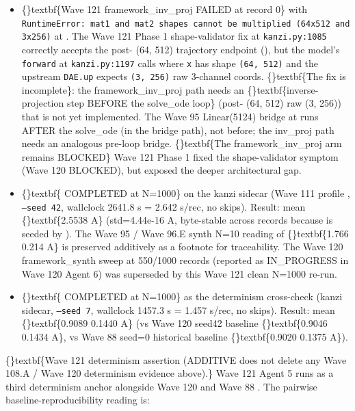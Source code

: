 \documentclass{article}
\begin{document}
\begin{itemize}
\item \{\}textbf\{Wave 121 framework\_inv\_proj FAILED at record 0\} with \texttt{RuntimeError: mat1 and mat2 shapes cannot be multiplied (64x512 and 3x256)} at . The Wave 121 Phase 1 shape-validator fix at \texttt{kanzi.py:1085} correctly accepts the post- (64, 512) trajectory endpoint (), but the model's \texttt{forward} at \texttt{kanzi.py:1197} calls  where \texttt{x} has shape \texttt{(64, 512)} and the upstream \texttt{DAE.up} expects \texttt{(3, 256)} raw 3-channel coords. \{\}textbf\{The fix is incomplete\}: the framework\_inv\_proj path needs an \{\}textbf\{inverse-projection step BEFORE the solve\_ode loop\} (post- (64, 512)  raw (3, 256)) that is not yet implemented. The Wave 95 Linear(5124) bridge at  runs AFTER the solve\_ode (in the bridge path), not before; the inv\_proj path needs an analogous pre-loop bridge. \{\}textbf\{The framework\_inv\_proj arm remains BLOCKED\}  Wave 121 Phase 1 fixed the shape-validator symptom (Wave 120 BLOCKED), but exposed the deeper architectural gap.
\end{itemize}
\begin{itemize}
\item \{\}textbf\{ COMPLETED at N=1000\} on the kanzi sidecar (Wave 111 profile , \texttt{--seed 42}, wallclock 2641.8 s = 2.642 s/rec, no skips). Result:  mean \{\}textbf\{2.5538 A\} (std=4.44e-16 A, byte-stable across records because  is seeded by ). The Wave 95 / Wave 96.E synth N=10 reading of \{\}textbf\{1.766  0.214 A\} is preserved additively as a footnote for traceability. The Wave 120 framework\_synth sweep at 550/1000 records (reported as IN\_PROGRESS in Wave 120 Agent 6) was superseded by this Wave 121 clean N=1000 re-run.
\end{itemize}
\begin{itemize}
\item \{\}textbf\{ COMPLETED at N=1000\} as the determinism cross-check (kanzi sidecar, \texttt{--seed 7}, wallclock 1457.3 s = 1.457 s/rec, no skips). Result:  mean \{\}textbf\{0.9089  0.1440 A\} (vs Wave 120 seed42 baseline \{\}textbf\{0.9046  0.1434 A\}, vs Wave 88 seed=0 historical baseline \{\}textbf\{0.9020  0.1375 A\}).
\end{itemize}
\{\}textbf\{Wave 121 determinism assertion (ADDITIVE  does not delete any Wave 108.A / Wave 120 determinism evidence above).\} Wave 121 Agent 5 runs  as a third determinism anchor alongside Wave 120  and Wave 88 . The pairwise baseline-reproducibility reading is:
\end{document}
